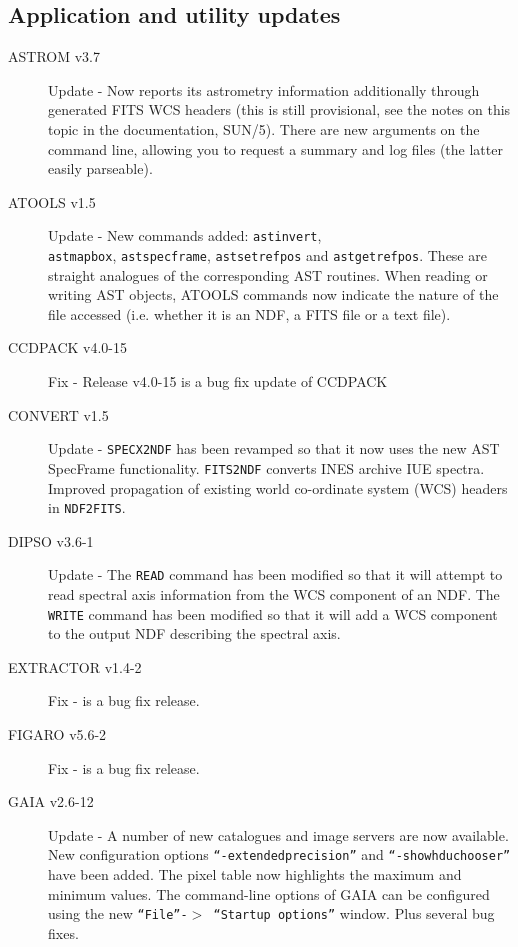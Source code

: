\documentclass[twoside,11pt]{article}
\newcommand{\xlabel}[1]{}
\renewcommand{\_}{\texttt{\symbol{95}}}
\begin{document}
\subsection{\xlabel{application_and_utility_updates}Application and utility updates}
\label{application_and_utility_updates}

\begin{description}
\item[ASTROM v3.7] Update - Now reports its astrometry information additionally
through generated FITS WCS headers (this is still provisional, see the notes on this
topic in the documentation, SUN/5). There are new arguments on the command line,
allowing you to request a summary and log files (the latter easily parseable).

\item[ATOOLS v1.5] Update - New commands added: \texttt{astinvert}, \\
\texttt{astmapbox}, \texttt{astspecframe}, \texttt{astsetrefpos} and \texttt{astgetrefpos}.
These are straight analogues of the corresponding AST routines. When reading or writing AST objects,
ATOOLS commands now indicate the nature of the file accessed (i.e. whether it is an NDF,
a FITS file or a text file).

\item[CCDPACK v4.0-15] Fix - Release v4.0-15 is a bug fix update of CCDPACK

\item[CONVERT v1.5] Update - \texttt{SPECX2NDF} has been revamped so that it now uses
the new AST SpecFrame functionality. \texttt{FITS2NDF} converts INES archive IUE
spectra. Improved propagation of existing world co-ordinate system (WCS)
headers in \texttt{NDF2FITS}.

\item[DIPSO v3.6-1] Update - The \texttt{READ} command has been modified so that it will
attempt to read spectral axis information from the WCS component of an NDF.
The \texttt{WRITE} command has been modified so that it will add a WCS component to the
output NDF describing the spectral axis.

\item[EXTRACTOR v1.4-2] Fix - is a bug fix release.

\item[FIGARO v5.6-2] Fix - is a bug fix release.

\item[GAIA v2.6-12] Update - A number of new catalogues and image servers are now available.
New configuration options \texttt{``-extended\_precision''} and \texttt{``-show\_hdu\_chooser''} have
been added. The pixel table now highlights the maximum and minimum values. The
command-line options of GAIA can be configured using the new
\texttt{``File''-$>$ ``Startup options''} window. Plus several bug fixes.


\end{description}
\end{document}
